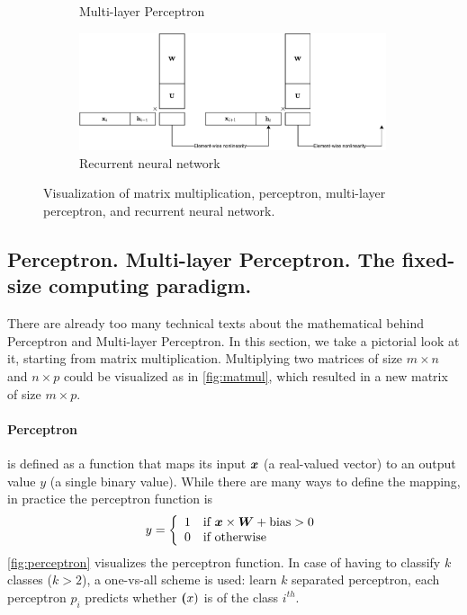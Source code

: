 \begin{figure}[t]
\begin{subfigure}[b]{0.6\textwidth}
    \caption{Multi-layer Perceptron}
    \label{fig:deep_matmul}
	\end{subfigure}
	\begin{subfigure}[b]{0.6\textwidth}
    \includegraphics[width=0.99\textwidth]{figures/RNN.pdf}
    \caption{Recurrent neural network}
    \label{fig:rnn}
	\end{subfigure}  \caption{Visualization of matrix multiplication, perceptron,
    multi-layer perceptron, and recurrent neural network.}
\end{figure}
\subsection{Perceptron. Multi-layer Perceptron. The fixed-size computing paradigm.}
There are already too many technical texts about the mathematical behind
Perceptron and Multi-layer Perceptron. In this section, we take a pictorial
look at it, starting from matrix multiplication. Multiplying two matrices of
size $m \times n$ and $n \times p$ could be visualized as in \cref{fig:matmul},
which resulted in a new matrix of size $m \times p$.

\paragraph{Perceptron} is defined as a function that maps its input $\boldsymbol{x}$
(a real-valued vector) to an output value $y$ (a single binary value). While
there are many ways to define the mapping, in practice the perceptron function is
\begin{align*}
  y =  \left\{ \begin{array}{ll}  1  & \mbox{if } \boldsymbol{x} \times \boldsymbol{W} + \text{bias} > 0 \\  0  & \mbox{if } \text{otherwise} \end{array} \right.
\end{align*}
\cref{fig:perceptron} visualizes the perceptron function. In case of having to
classify $k$ classes ($k>2$), a one-vs-all scheme is used: learn $k$ separated
perceptron, each perceptron $p_i$ predicts whether $\boldsymbol{(}x)$ is of the class
$i^{th}$.

